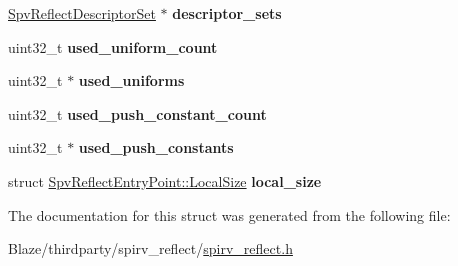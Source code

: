\begin{DoxyCompactItemize}
\item 
\mbox{\label{structSpvReflectEntryPoint_a69169b774144628a15371996b88b21c6}} 
\hyperlink{structSpvReflectDescriptorSet}{Spv\+Reflect\+Descriptor\+Set} $\ast$ {\bfseries descriptor\+\_\+sets}
\item 
\mbox{\label{structSpvReflectEntryPoint_a95fe831aea92ad107f254e8729111cfa}} 
uint32\+\_\+t {\bfseries used\+\_\+uniform\+\_\+count}
\item 
\mbox{\label{structSpvReflectEntryPoint_a61044dc7e8d074370c7c60a1da00fd1e}} 
uint32\+\_\+t $\ast$ {\bfseries used\+\_\+uniforms}
\item 
\mbox{\label{structSpvReflectEntryPoint_a7ea4b47012867bf5ea2d2b688f7d1c45}} 
uint32\+\_\+t {\bfseries used\+\_\+push\+\_\+constant\+\_\+count}
\item 
\mbox{\label{structSpvReflectEntryPoint_a96a46b8f5682fb589c19cd261aade7bc}} 
uint32\+\_\+t $\ast$ {\bfseries used\+\_\+push\+\_\+constants}
\item 
\mbox{\label{structSpvReflectEntryPoint_a9bf2cf11804ee110a5efa3eaa347c2c6}} 
struct \hyperlink{structSpvReflectEntryPoint_1_1LocalSize}{Spv\+Reflect\+Entry\+Point\+::\+Local\+Size} {\bfseries local\+\_\+size}
\end{DoxyCompactItemize}


The documentation for this struct was generated from the following file\+:\begin{DoxyCompactItemize}
\item 
Blaze/thirdparty/spirv\+\_\+reflect/\hyperlink{spirv__reflect_8h}{spirv\+\_\+reflect.\+h}\end{DoxyCompactItemize}
